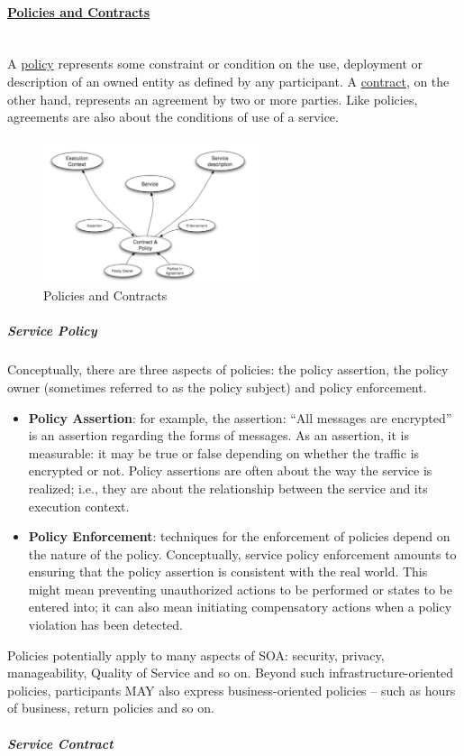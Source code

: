 \documentclass[10pt,a4paper]{article}
\newcommand{\myparagraph}[1]{\paragraph{\uline{#1}}\mbox{}\\[0.05in]}
\begin{document}
\myparagraph{Policies and Contracts}
A \uline{policy} represents some constraint or condition on the use, deployment or description of an owned entity as defined by any participant. A \uline{contract}, on the other hand, represents an agreement by two or more parties. Like policies, agreements are also about the conditions of use of a service.
\begin{figure}[h!]
 \hfill \includegraphics[width=180pt]{images/policies-contracts}\hspace*{\fill}
  \caption{Policies and Contracts}
  \label{fig:policies-and-contracts}
\end{figure}
\subparagraph{Service Policy}
Conceptually, there are three aspects of policies: the policy assertion, the policy owner (sometimes referred to as the policy subject) and policy enforcement.
\begin{itemize}
	\item \textbf{Policy Assertion}: for example, the assertion: “All messages are encrypted” is an assertion regarding the forms of messages. As an assertion, it is measurable: it may be true or false depending on whether the traffic is encrypted or not. Policy assertions are often about the way the service is realized; i.e., they are about the relationship between the service and its execution context.
	\item \textbf{Policy Enforcement}: techniques for the enforcement of policies depend on the nature of the policy. Conceptually, service policy enforcement amounts to ensuring that the policy assertion is consistent with the real world. This might mean preventing unauthorized actions to be performed or states to be entered into; it can also mean initiating compensatory actions when a policy violation has been detected.
\end{itemize}
Policies potentially apply to many aspects of SOA: security, privacy, manageability, Quality of Service and so on. Beyond such infrastructure-oriented policies, participants MAY also express business-oriented policies – such as hours of business, return policies and so on.
\subparagraph{Service Contract}
\end{document}
